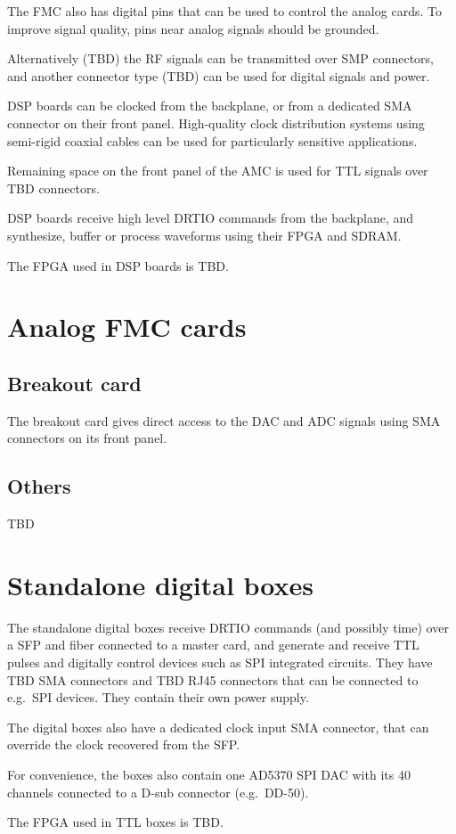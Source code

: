 \documentclass[11pt]{paper}
\begin{document}
The FMC also has digital pins that can be used to control the analog cards. To improve signal quality, pins near analog signals should be grounded.

Alternatively (TBD) the RF signals can be transmitted over SMP connectors, and another connector type (TBD) can be used for digital signals and power.

DSP boards can be clocked from the backplane, or from a dedicated SMA connector on their front panel. High-quality clock distribution systems using semi-rigid coaxial cables can be used for particularly sensitive applications.

Remaining space on the front panel of the AMC is used for TTL signals over TBD connectors.

DSP boards receive high level DRTIO commands from the backplane, and synthesize, buffer or process waveforms using their FPGA and SDRAM.

The FPGA used in DSP boards is TBD.

\section{Analog FMC cards}
\subsection{Breakout card}
The breakout card gives direct access to the DAC and ADC signals using SMA connectors on its front panel.

\subsection{Others}
TBD

\section{Standalone digital boxes}
The standalone digital boxes receive DRTIO commands (and possibly time) over a SFP and fiber connected to a master card, and generate and receive TTL pulses and digitally control devices such as SPI integrated circuits. They have TBD SMA connectors and TBD RJ45 connectors that can be connected to e.g.\ SPI devices. They contain their own power supply.

The digital boxes also have a dedicated clock input SMA connector, that can override the clock recovered from the SFP.

For convenience, the boxes also contain one AD5370 SPI DAC with its 40 channels connected to a D-sub connector (e.g.\ DD-50).

The FPGA used in TTL boxes is TBD.
\end{document}
